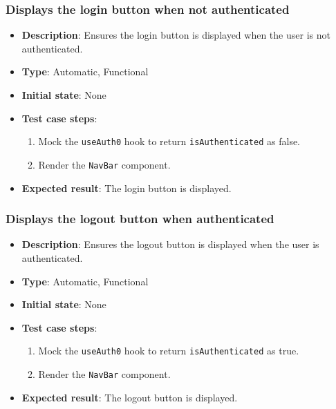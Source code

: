 \documentclass[12pt, titlepage]{article}
\begin{document}
\subsubsection{Displays the login button when not authenticated}
\begin{itemize}
    \item \textbf{Description}: Ensures the login button is displayed when the user is not authenticated.
    \item \textbf{Type}: Automatic, Functional
    \item \textbf{Initial state}: None
    \item \textbf{Test case steps}:
    \begin{enumerate}
        \item Mock the \texttt{useAuth0} hook to return \texttt{isAuthenticated} as false.
        \item Render the \texttt{NavBar} component.
    \end{enumerate}
    \item \textbf{Expected result}: The login button is displayed.
\end{itemize}

\subsubsection{Displays the logout button when authenticated}
\begin{itemize}
    \item \textbf{Description}: Ensures the logout button is displayed when the user is authenticated.
    \item \textbf{Type}: Automatic, Functional
    \item \textbf{Initial state}: None
    \item \textbf{Test case steps}:
    \begin{enumerate}
        \item Mock the \texttt{useAuth0} hook to return \texttt{isAuthenticated} as true.
        \item Render the \texttt{NavBar} component.
    \end{enumerate}
    \item \textbf{Expected result}: The logout button is displayed.
\end{itemize}
\end{document}

